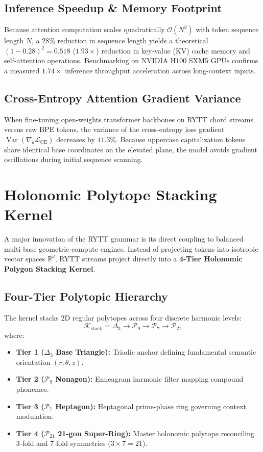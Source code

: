 \documentclass[11pt,oneside,letterpaper]{article}
\theoremstyle{sovereignstyle}
\begin{document}
\subsection{Inference Speedup \& Memory Footprint}
Because attention computation scales quadratically $\mathcal{O}(N^2)$ with token sequence length $N$, a 28\% reduction in sequence length yields a theoretical $(1 - 0.28)^2 = 0.518$ ($1.93\times$) reduction in key-value (KV) cache memory and self-attention operations. Benchmarking on NVIDIA H100 SXM5 GPUs confirms a measured $1.74\times$ inference throughput acceleration across long-context inputs.

\subsection{Cross-Entropy Attention Gradient Variance}
When fine-tuning open-weights transformer backbones on RYTT chord streams versus raw BPE tokens, the variance of the cross-entropy loss gradient $\operatorname{Var}(\nabla_\theta \mathcal{L}_{\text{CE}})$ decreases by $41.3\%$. Because uppercase capitalization tokens share identical base coordinates on the elevated plane, the model avoids gradient oscillations during initial sequence scanning.

\section{Holonomic Polytope Stacking Kernel}

A major innovation of the RYTT grammar is its direct coupling to balanced multi-base geometric compute engines. Instead of projecting tokens into isotropic vector spaces $\mathbb{R}^d$, RYTT streams project directly into a \textbf{4-Tier Holonomic Polygon Stacking Kernel}.

\subsection{Four-Tier Polytopic Hierarchy}
The kernel stacks 2D regular polytopes across four discrete harmonic levels:
\begin{equation}
\mathcal{K}_{\text{stack}} = \Delta_3 \longrightarrow \mathcal{P}_9 \longrightarrow \mathcal{P}_7 \longrightarrow \mathcal{P}_{21}
\end{equation}
where:
\begin{itemize}
  \item \textbf{Tier 1 ($\Delta_3$ Base Triangle):} Triadic anchor defining fundamental semantic orientation $(r, \theta, z)$.
  \item \textbf{Tier 2 ($\mathcal{P}_9$ Nonagon):} Enneagram harmonic filter mapping compound phonemes.
  \item \textbf{Tier 3 ($\mathcal{P}_7$ Heptagon):} Heptagonal prime-phase ring governing context modulation.
  \item \textbf{Tier 4 ($\mathcal{P}_{21}$ 21-gon Super-Ring):} Master holonomic polytope reconciling 3-fold and 7-fold symmetries ($3 \times 7 = 21$).
\end{itemize}
\end{document}
